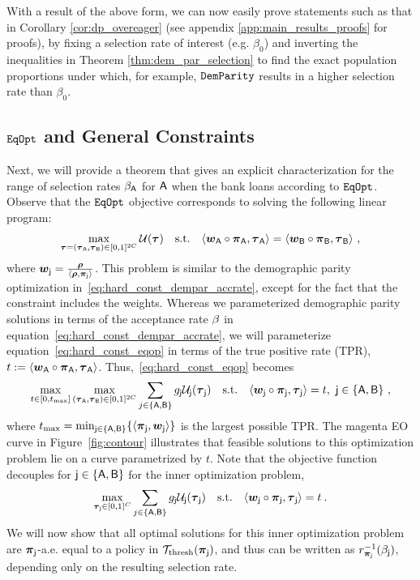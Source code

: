 		With a result of the above form, we can now easily prove statements such as that in Corollary \ref{cor:dp_overeager} (see appendix \ref{app:main_results_proofs} for proofs), by fixing a selection rate of interest (e.g. $\beta_0$) and inverting the inequalities in Theorem \ref{thm:dem_par_selection} to find the exact population proportions under which, for example, $\mathtt{DemParity}$ results in a higher selection rate than $\beta_0$.

	\subsection{$\mathtt{EqOpt}$ and General Constraints} \label{sec:eqop_proof}
		Next, we will provide a theorem that gives an explicit characterization for the range of selection rates $\beta_{\mathsf{A}}$ for $\mathsf{A}$ when the bank loans according to $\mathtt{EqOpt}$. 
		Observe that the $\mathtt{EqOpt}$ objective corresponds to solving the following linear program:
		\begin{eqnarray}\label{eq:hard_const_eqop}
		\max_{\boldsymbol{\tau} = (\boldsymbol{\tau}_{\mathsf{A}},\boldsymbol{\tau}_{\mathsf{B}}) \in [0,1]^{2C}}\mathcal{U}(\boldsymbol{\tau}) \quad \mathrm{s.t.} \quad \langle \boldsymbol{w}_{\mathsf{A}} \circ  \boldsymbol{\pi}_{\mathsf{A}}, \boldsymbol{\tau}_{\mathsf{A}} \rangle = \langle \boldsymbol{w}_{\mathsf{B}} \circ  \boldsymbol{\pi}_{\mathsf{B}}, \boldsymbol{\tau}_{\mathsf{B}} \rangle~,
		\end{eqnarray}
		where $\boldsymbol{w}_{\mathsf{j}} = \frac{\boldsymbol{\rho}}{\langle \boldsymbol{\rho}, \boldsymbol{\pi}_{\mathsf{j}}\rangle}$. This problem is similar to the demographic parity optimization in~\eqref{eq:hard_const_dempar_accrate}, except for the fact that the constraint includes the weights. 
		Whereas we parameterized demographic parity solutions in terms of the acceptance rate $\beta$ in equation~\eqref{eq:hard_const_dempar_accrate}, we will parameterize equation~\eqref{eq:hard_const_eqop} in terms of the true positive rate (TPR), $t:= \langle \boldsymbol{w}_{\mathsf{A}} \circ  \boldsymbol{\pi}_{\mathsf{A}}, \boldsymbol{\tau}_{\mathsf{A}} \rangle$. Thus,~\eqref{eq:hard_const_eqop} becomes 
		\begin{eqnarray}\label{eq:hard_const_eqop_2}
		\max_{t \in [0,t_{\max}]} \max_{(\boldsymbol{\tau}_{\mathsf{A}},\boldsymbol{\tau}_{\mathsf{B}}) \in [0,1]^{2C}}\sum_{j \in \{\mathsf{A}, \mathsf{B}\}}g_{\mathsf{j}} \mathcal{U}_{\mathsf{j}}(\boldsymbol{\tau}_{\mathsf{j}}) \quad \mathrm{s.t.} \quad \langle \boldsymbol{w}_{\mathsf{j}} \circ  \boldsymbol{\pi}_{\mathsf{j}}, \boldsymbol{\tau}_{\mathsf{j}} \rangle = t,~\mathsf{j}\in\{\mathsf{A}, \mathsf{B}\}~,
		\end{eqnarray}
		where $t_{\max} = \min_{\mathsf{j} \in \{\mathsf{A}, \mathsf{B}\}}\{\langle \boldsymbol{\pi}_{\mathsf{j}}, \boldsymbol{w}_{\mathsf{j}} \rangle\}$ is the largest possible TPR. The magenta EO curve in Figure~\ref{fig:contour} illustrates that feasible solutions to this optimization problem lie on a curve parametrized by $t$.
		Note that the objective function decouples for $\mathsf{j} \in \{\mathsf{A}, \mathsf{B}\}$ for the inner optimization problem,
		\begin{eqnarray}\label{eq:hard_const_eqop_3}
		\max_{\boldsymbol{\tau}_{\mathsf{j}} \in [0,1]^{C}}\sum_{j \in \{\mathsf{A}, \mathsf{B}\}}g_{\mathsf{j}} \mathcal{U}_{\mathsf{j}}(\boldsymbol{\tau}_{\mathsf{j}}) \quad \mathrm{s.t.} \quad \langle \boldsymbol{w}_{\mathsf{j}} \circ  \boldsymbol{\pi}_{\mathsf{j}}, \boldsymbol{\tau}_{\mathsf{j}} \rangle = t\:.
		\end{eqnarray}
		We will now show that all optimal solutions for this inner optimization problem are $\boldsymbol{\pi}_{\mathsf{j}}$-a.e. equal to a policy in $\mathcal{T}_{\mathrm{thresh}}(\boldsymbol{\pi}_{\mathsf{j}})$, and thus can be written as $r_{\boldsymbol{\pi}_{\mathsf{j}}}^{-1}(\beta_{\mathsf{j}})$, depending only on the resulting selection rate.
		
